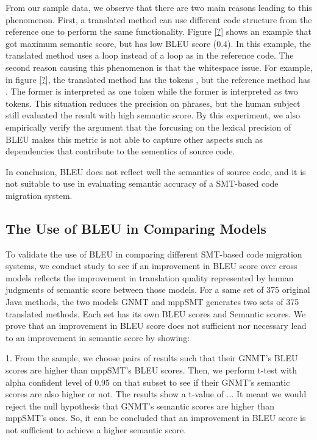 From our sample data, we observe that there are two main reasons leading 
to this phenomenon.
%
First, a translated method can use different code structure from the 
reference one to perform the same functionality. Figure \ref{?} shows an example
that got maximum semantic score, but has low BLEU score (0.4). In this example, 
the translated method uses a  loop instead of a  
loop as in the reference code. The second reason causing this phenomenon 
is that the whitespace issue. For example, in figure \ref{?}, the translated method has the 
tokens , but the reference method has . The former 
is interpreted as one token while the former is interpreted as two tokens. 
This situation reduces the precision on phrases, but the human subject still
evaluated the result with high semantic score. By this experiment, we also empirically 
verify the argument that the forcusing on the lexical precision of BLEU makes
this metric is not able to capture other aspects such as dependencies 
that contribute to the sementics of source code.

In conclusion, BLEU does not reflect well the
semantics of source code, and it is not suitable to use in evaluating
semantic accuracy of a SMT-based code migration system.

\subsection{The Use of BLEU in Comparing Models}
To validate the use of BLEU in comparing different SMT-based code migration systems, we conduct study to see if an improvement in BLEU score over cross models reflects the improvement in translation quality represented by human judgments of semantic score between those models. For a same set of 375 original Java methods, the two models GNMT and mppSMT generates two sets of 375 translated methods. Each set has its own BLEU scores and Semantic scores.
We prove that an improvement in BLEU score does not sufficient nor necessary lead to an improvement in semantic score by showing:

1. From the sample, we choose pairs of results such that their GNMT's BLEU scores are higher than mppSMT's BLEU scores. Then, we perform t-test with alpha confident level of 0.95 on that subset to see if their GNMT's semantic scores are also higher or not. The results show a t-value of ... It meant we would reject the null hypothesis that GNMT's semantic scores are higher than mppSMT's ones. So, it can be concluded that an improvement in BLEU score is not sufficient to achieve a higher semantic score. 

